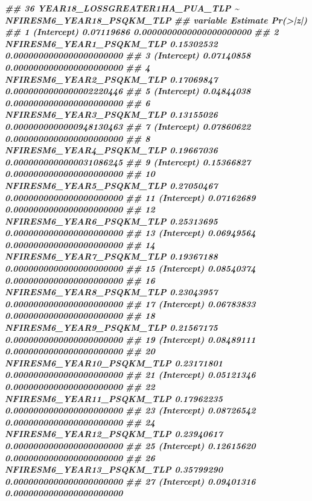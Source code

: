 \documentclass[10pt,landscape,a3paper]{article}
\newenvironment{Shaded}{\begin{snugshade}}{\end{snugshade}}
\newcommand{\DocumentationTok}[1]{\textcolor[rgb]{0.56,0.35,0.01}{\textbf{\textit{#1}}}}
\begin{document}
\begin{Shaded}
\begin{Highlighting}[]
\DocumentationTok{\#\# 36 YEAR18\_LOSSGREATER1HA\_PUA\_TLP \textasciitilde{} NFIRESM6\_YEAR18\_PSQKM\_TLP}
\DocumentationTok{\#\#                     variable   Estimate                 Pr(\textgreater{}|z|)}
\DocumentationTok{\#\# 1                (Intercept) 0.07119686 0.0000000000000000000000}
\DocumentationTok{\#\# 2   NFIRESM6\_YEAR1\_PSQKM\_TLP 0.15302532 0.0000000000000000000000}
\DocumentationTok{\#\# 3                (Intercept) 0.07140858 0.0000000000000000000000}
\DocumentationTok{\#\# 4   NFIRESM6\_YEAR2\_PSQKM\_TLP 0.17069847 0.0000000000000002220446}
\DocumentationTok{\#\# 5                (Intercept) 0.04844038 0.0000000000000000000000}
\DocumentationTok{\#\# 6   NFIRESM6\_YEAR3\_PSQKM\_TLP 0.13155026 0.0000000000000948130463}
\DocumentationTok{\#\# 7                (Intercept) 0.07860622 0.0000000000000000000000}
\DocumentationTok{\#\# 8   NFIRESM6\_YEAR4\_PSQKM\_TLP 0.19667036 0.0000000000000031086245}
\DocumentationTok{\#\# 9                (Intercept) 0.15366827 0.0000000000000000000000}
\DocumentationTok{\#\# 10  NFIRESM6\_YEAR5\_PSQKM\_TLP 0.27050467 0.0000000000000000000000}
\DocumentationTok{\#\# 11               (Intercept) 0.07162689 0.0000000000000000000000}
\DocumentationTok{\#\# 12  NFIRESM6\_YEAR6\_PSQKM\_TLP 0.25313695 0.0000000000000000000000}
\DocumentationTok{\#\# 13               (Intercept) 0.06949564 0.0000000000000000000000}
\DocumentationTok{\#\# 14  NFIRESM6\_YEAR7\_PSQKM\_TLP 0.19367188 0.0000000000000000000000}
\DocumentationTok{\#\# 15               (Intercept) 0.08540374 0.0000000000000000000000}
\DocumentationTok{\#\# 16  NFIRESM6\_YEAR8\_PSQKM\_TLP 0.23043957 0.0000000000000000000000}
\DocumentationTok{\#\# 17               (Intercept) 0.06783833 0.0000000000000000000000}
\DocumentationTok{\#\# 18  NFIRESM6\_YEAR9\_PSQKM\_TLP 0.21567175 0.0000000000000000000000}
\DocumentationTok{\#\# 19               (Intercept) 0.08489111 0.0000000000000000000000}
\DocumentationTok{\#\# 20 NFIRESM6\_YEAR10\_PSQKM\_TLP 0.23171801 0.0000000000000000000000}
\DocumentationTok{\#\# 21               (Intercept) 0.05121346 0.0000000000000000000000}
\DocumentationTok{\#\# 22 NFIRESM6\_YEAR11\_PSQKM\_TLP 0.17962235 0.0000000000000000000000}
\DocumentationTok{\#\# 23               (Intercept) 0.08726542 0.0000000000000000000000}
\DocumentationTok{\#\# 24 NFIRESM6\_YEAR12\_PSQKM\_TLP 0.23940617 0.0000000000000000000000}
\DocumentationTok{\#\# 25               (Intercept) 0.12615620 0.0000000000000000000000}
\DocumentationTok{\#\# 26 NFIRESM6\_YEAR13\_PSQKM\_TLP 0.35799290 0.0000000000000000000000}
\DocumentationTok{\#\# 27               (Intercept) 0.09401316 0.0000000000000000000000}

\end{Highlighting}
\end{Shaded}
\end{document}
